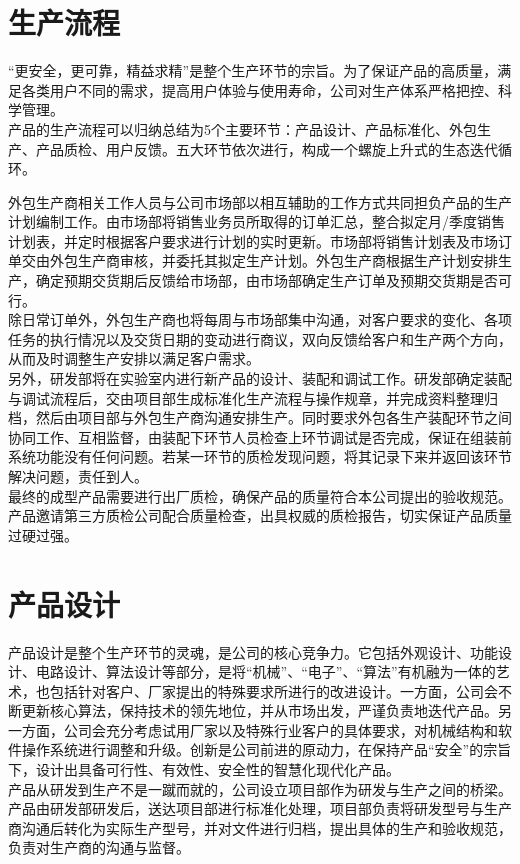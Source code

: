 \documentclass[violet]{main}
\begin{document}
		\section{生产流程}
			“更安全，更可靠，精益求精”是整个生产环节的宗旨。为了保证产品的高质量，满足各类用户不同的需求，提高用户体验与使用寿命，公司对生产体系严格把控、科学管理。
			\\\indent 产品的生产流程可以归纳总结为5个主要环节：产品设计、产品标准化、外包生产、产品质检、用户反馈。五大环节依次进行，构成一个螺旋上升式的生态迭代循环。
			\begin{center}
			\end{center}
			\par 外包生产商相关工作人员与公司市场部以相互辅助的工作方式共同担负产品的生产计划编制工作。由市场部将销售业务员所取得的订单汇总，整合拟定月/季度销售计划表，并定时根据客户要求进行计划的实时更新。市场部将销售计划表及市场订单交由外包生产商审核，并委托其拟定生产计划。外包生产商根据生产计划安排生产，确定预期交货期后反馈给市场部，由市场部确定生产订单及预期交货期是否可行。
			\\\indent 除日常订单外，外包生产商也将每周与市场部集中沟通，对客户要求的变化、各项任务的执行情况以及交货日期的变动进行商议，双向反馈给客户和生产两个方向，从而及时调整生产安排以满足客户需求。
			\\\indent 另外，研发部将在实验室内进行新产品的设计、装配和调试工作。研发部确定装配与调试流程后，交由项目部生成标准化生产流程与操作规章，并完成资料整理归档，然后由项目部与外包生产商沟通安排生产。同时要求外包各生产装配环节之间协同工作、互相监督，由装配下环节人员检查上环节调试是否完成，保证在组装前系统功能没有任何问题。若某一环节的质检发现问题，将其记录下来并返回该环节解决问题，责任到人。
			\\\indent 最终的成型产品需要进行出厂质检，确保产品的质量符合本公司提出的验收规范。产品邀请第三方质检公司配合质量检查，出具权威的质检报告，切实保证产品质量过硬过强。
			\section{产品设计}
			产品设计是整个生产环节的灵魂，是公司的核心竞争力。它包括外观设计、功能设计、电路设计、算法设计等部分，是将“机械”、“电子”、“算法”有机融为一体的艺术，也包括针对客户、厂家提出的特殊要求所进行的改进设计。一方面，公司会不断更新核心算法，保持技术的领先地位，并从市场出发，严谨负责地迭代产品。另一方面，公司会充分考虑试用厂家以及特殊行业客户的具体要求，对机械结构和软件操作系统进行调整和升级。创新是公司前进的原动力，在保持产品“安全”的宗旨下，设计出具备可行性、有效性、安全性的智慧化现代化产品。
			\\\indent 产品从研发到生产不是一蹴而就的，公司设立项目部作为研发与生产之间的桥梁。产品由研发部研发后，送达项目部进行标准化处理，项目部负责将研发型号与生产商沟通后转化为实际生产型号，并对文件进行归档，提出具体的生产和验收规范，负责对生产商的沟通与监督。
\end{document}
